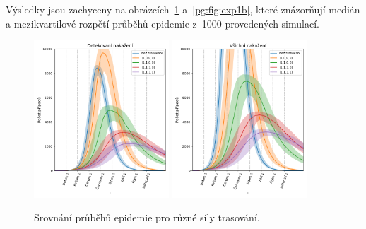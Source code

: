 Výsledky jsou zachyceny na obrázcích~\ref{pg:fig:exp1a}
a~\ref{pg:fig:exp1b}, které znázorňují medián a mezikvartilové rozpětí
průběhů epidemie z~1000 provedených simulací.



\begin{figure}[ht]
  \centering
  \includegraphics[width=0.45\textwidth]{pic/history_second_exp_detected_iqr.png}
  \includegraphics[width=0.45\textwidth]{pic/history_second_exp_all_iqr.png}
  \caption{Srovnání průběhů epidemie pro různé síly trasování.}
  \label{pg:fig:exp1a}
\end{figure}

